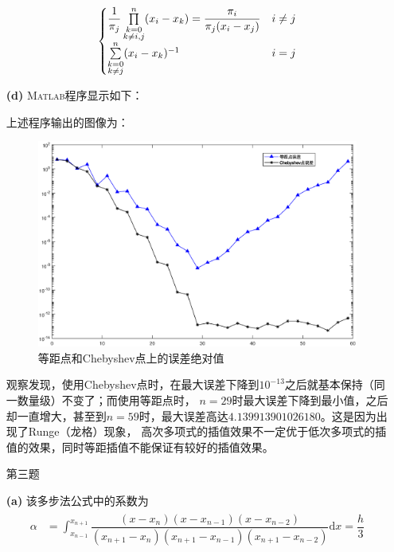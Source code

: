 \documentclass[12pt,a4paper,utf8]{ctexart}
\begin{document}
\begin{enumerate}
\begin{eqnarray}
\begin{aligned}
\begin{cases}
                  \dfrac{1}{\pi_j}\prod\limits_{\substack{k=0 \\k \neq i,j}}^{n}(x_i-x_k)=\dfrac{\pi_i}{\pi_j(x_i-x_j)} & i \neq j \cr
                  \sum\limits_{\substack{k=0                  \\ k\neq j}}^{n}(x_i-x_k)^{-1} & i=j
               \end{cases}
            \end{aligned}
         \end{eqnarray}
   \item[\textbf{(d)}]
         \textsc{Matlab}程序显示如下：
         
         上述程序输出的图像为：
         \begin{figure}[H]
            \centering
            \includegraphics[width=1\textwidth]{fig/p2d.eps}
            \caption{等距点和Chebyshev点上的误差绝对值}
         \end{figure}
         观察发现，使用Chebyshev点时，在最大误差下降到$10^{-13}$之后就基本保持（同一数量级）不变了；而使用等距点时，
         $n=29$时最大误差下降到最小值，之后却一直增大，甚至到$n=59$时，最大误差高达$4.139913901026180$。这是因为出现了Runge（龙格）现象，
         高次多项式的插值效果不一定优于低次多项式的插值的效果，同时等距插值不能保证有较好的插值效果。
   \item[第三题]
   \item[\textbf{(a)}]该多步法公式中的系数为
         \begin{eqnarray}
            \begin{aligned}
               \alpha & =\int_{x_{n-1}}^{x_{n+1}}\dfrac{(x-x_{n})(x-x_{n-1})(x-x_{n-2})}{(x_{n+1}-x_{n})(x_{n+1}-x_{n-1})(x_{n+1}-x_{n-2})}\mathrm{d}x=\dfrac{h}{3} \\

\end{aligned}
\end{eqnarray}
\end{enumerate}
\end{document}
